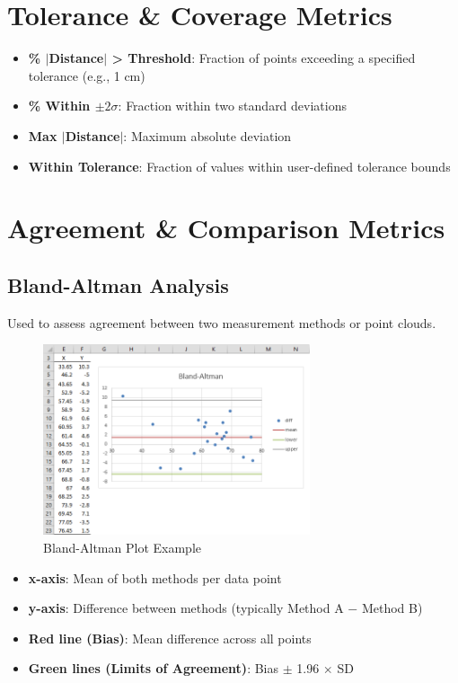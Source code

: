 \documentclass[12pt]{article}
\begin{document}
\section{Tolerance \& Coverage Metrics}

\begin{itemize}
    \item \textbf{\% $|$Distance$|$ > Threshold}: Fraction of points exceeding a specified tolerance (e.g., 1 cm)
    \item \textbf{\% Within $\pm2\sigma$}: Fraction within two standard deviations
    \item \textbf{Max $|$Distance$|$}: Maximum absolute deviation
    \item \textbf{Within Tolerance}: Fraction of values within user-defined tolerance bounds
\end{itemize}

\section{Agreement \& Comparison Metrics}

\subsection{Bland-Altman Analysis}
Used to assess agreement between two measurement methods or point clouds.

\begin{figure}[h]
    \centering
    \includegraphics[width=0.7\textwidth]{bland_altman_example.png}
    \caption{Bland-Altman Plot Example}
    \label{fig:bland_altman}
\end{figure}

\begin{itemize}
    \item \textbf{x-axis}: Mean of both methods per data point
    \item \textbf{y-axis}: Difference between methods (typically Method A $-$ Method B)
    \item \textbf{Red line (Bias)}: Mean difference across all points
    \item \textbf{Green lines (Limits of Agreement)}: Bias $\pm$ 1.96 $\times$ SD
\end{itemize}
\end{document}
